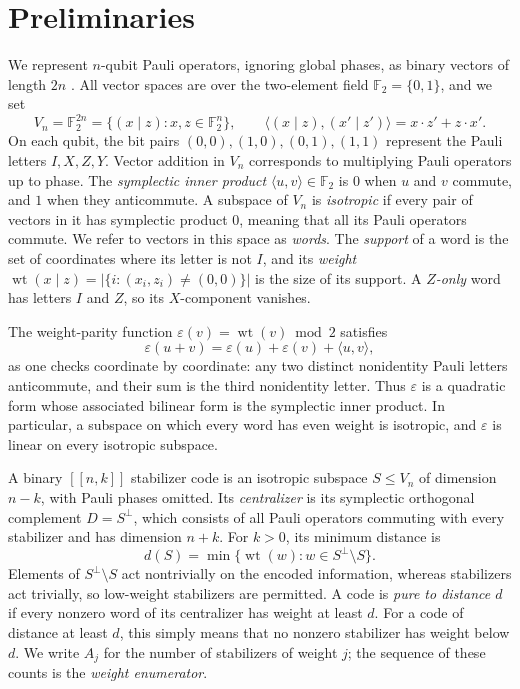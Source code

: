 \documentclass[11pt]{article}
\theoremstyle{definition}
\theoremstyle{remark}
\newcommand{\F}{\mathbb F_2}
\newcommand{\qc}[1]{[\![#1]\!]}
\newcommand{\wt}{\operatorname{wt}}
\begin{document}
\section{Preliminaries}\label{sec:prelim}

We represent \(n\)-qubit Pauli operators, ignoring global phases, as
binary vectors of length \(2n\) \cite{crss}. All vector spaces are over
the two-element field \(\F=\{0,1\}\), and we set
\[
 V_n=\F^{2n}=\{(x\mid z):x,z\in\F^n\},\qquad
 \langle(x\mid z),(x'\mid z')\rangle=x\cdot z'+z\cdot x'.
\]
On each qubit, the bit pairs \((0,0),(1,0),(0,1),(1,1)\) represent the
Pauli letters \(I,X,Z,Y\). Vector addition in \(V_n\) corresponds to
multiplying Pauli operators up to phase. The \emph{symplectic inner
product} \(\langle u,v\rangle\in\F\) is \(0\) when \(u\) and \(v\)
commute, and \(1\) when they anticommute. A subspace of \(V_n\) is
\emph{isotropic} if every pair of vectors in it has symplectic product
\(0\), meaning that all its Pauli operators commute. We refer to vectors
in this space as \emph{words}. The \emph{support} of a word is the set
of coordinates where its letter is not \(I\), and its \emph{weight}
\(\wt(x\mid z)=|\{i:(x_i,z_i)\ne(0,0)\}|\) is the size of its support.
A \emph{\(Z\)-only} word has letters \(I\) and \(Z\), so its
\(X\)-component vanishes.

The weight-parity function \(\varepsilon(v)=\wt(v)\bmod2\) satisfies
\begin{equation}\label{eq:polar}
 \varepsilon(u+v)=\varepsilon(u)+\varepsilon(v)+\langle u,v\rangle,
\end{equation}
as one checks coordinate by coordinate: any two distinct nonidentity
Pauli letters anticommute, and their sum is the third nonidentity
letter. Thus \(\varepsilon\) is a quadratic form whose associated
bilinear form is the symplectic inner product. In particular, a subspace
on which every word has even weight is isotropic, and \(\varepsilon\) is
linear on every isotropic subspace.

A binary \(\qc{n,k}\) stabilizer code is an isotropic subspace
\(S\leq V_n\) of dimension \(n-k\), with Pauli phases omitted. Its
\emph{centralizer} is its symplectic orthogonal complement
\(D=S^\perp\), which consists of all Pauli operators commuting with
every stabilizer and has dimension \(n+k\). For \(k>0\), its minimum
distance is
\[
 d(S)=\min\{\wt(w):w\in S^\perp\setminus S\}.
\]
Elements of \(S^\perp\setminus S\) act nontrivially on the encoded
information, whereas stabilizers act trivially, so low-weight
stabilizers are permitted. A code is \emph{pure to distance \(d\)} if
every nonzero word of its centralizer has weight at least \(d\). For a
code of distance at least \(d\), this simply means that no nonzero
stabilizer has weight below \(d\). We write \(A_j\) for the number of
stabilizers of weight \(j\); the sequence of these counts is the
\emph{weight enumerator}.
\end{document}
